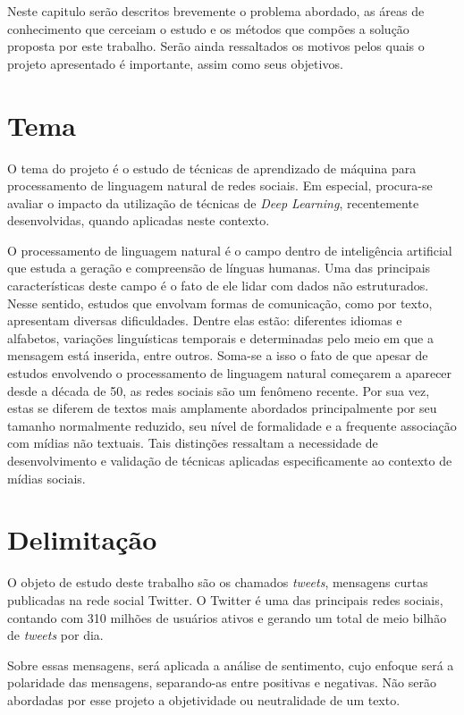 Neste capitulo serão descritos brevemente o problema abordado, as áreas de conhecimento que cerceiam o estudo e os
métodos que compões a solução proposta por este trabalho.
Serão ainda ressaltados os motivos pelos quais o projeto apresentado é importante, assim como seus objetivos.

\section{Tema}

O tema do projeto é o estudo de técnicas de aprendizado de máquina para processamento de linguagem natural de redes
sociais.
Em especial, procura-se avaliar o impacto da utilização de técnicas de \textit{Deep Learning}, recentemente
desenvolvidas, quando aplicadas neste contexto.

O processamento de linguagem natural é o campo dentro de inteligência artificial que estuda a geração e compreensão de
línguas humanas.
Uma das principais características deste campo é o fato de ele lidar com dados não estruturados.
Nesse sentido, estudos que envolvam formas de comunicação, como por texto, apresentam diversas dificuldades.
Dentre elas estão: diferentes idiomas e alfabetos, variações linguísticas temporais e determinadas pelo meio em que a
mensagem está inserida, entre outros.
Soma-se a isso o fato de que apesar de estudos envolvendo o processamento de linguagem natural começarem a aparecer
desde a década de 50, as redes sociais são um fenômeno recente.
Por sua vez, estas se diferem de textos mais amplamente abordados principalmente por seu tamanho normalmente reduzido,
seu nível de formalidade e a frequente associação com mídias não textuais.
Tais distinções ressaltam a necessidade de desenvolvimento e validação de técnicas aplicadas especificamente ao contexto
de mídias sociais.

\section{Delimitação}

O objeto de estudo deste trabalho são os chamados \textit{tweets}, mensagens curtas publicadas na rede social Twitter.
O Twitter é uma das principais redes sociais, contando com 310 milhões de usuários ativos e gerando um total de meio
bilhão de \textit{tweets} por dia.

Sobre essas mensagens, será aplicada a análise de sentimento, cujo enfoque será a polaridade das mensagens,
separando-as entre positivas e negativas.
Não serão abordadas por esse projeto a objetividade ou neutralidade de um texto.

